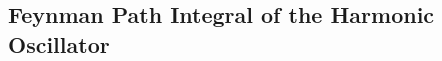 % 


% 

% 
% 
% 


% 
% 

\newpage
\setcounter{section}{4}
\setcounter{subsection}{0}
\subsection{Feynman Path Integral of the Harmonic Oscillator}



% 